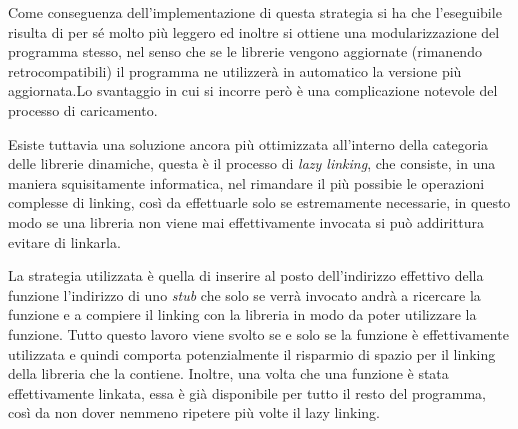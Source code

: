 \documentclass[class=book, crop=false, oneside]{standalone}
\begin{document}
Come conseguenza dell'implementazione di questa strategia si ha che l'eseguibile risulta di per sé molto più leggero ed inoltre si ottiene una modularizzazione del programma stesso, nel senso che se le librerie vengono aggiornate (rimanendo retrocompatibili) il programma ne utilizzerà in automatico la versione più aggiornata.Lo svantaggio in cui si incorre però è una complicazione notevole del processo di caricamento.

Esiste tuttavia una soluzione ancora più ottimizzata all'interno della categoria delle librerie dinamiche, questa è il processo di \emph{lazy linking}, che consiste, in una maniera squisitamente informatica, nel rimandare il più possibie le operazioni complesse di linking, così da effettuarle solo se estremamente necessarie, in questo modo se una libreria non viene mai effettivamente invocata si può addirittura evitare di linkarla.

La strategia utilizzata è quella di inserire al posto dell'indirizzo effettivo della funzione l'indirizzo di uno \emph{stub} che solo se verrà invocato andrà a ricercare la funzione e a compiere il linking con la libreria in modo da poter utilizzare la funzione. Tutto questo lavoro viene svolto se e solo se la funzione è effettivamente utilizzata e quindi comporta potenzialmente il risparmio di spazio per il linking della libreria che la contiene. Inoltre, una volta che una funzione è stata effettivamente linkata, essa è già disponibile per tutto il resto del programma, così da non dover nemmeno ripetere più volte il lazy linking.
\end{document}
